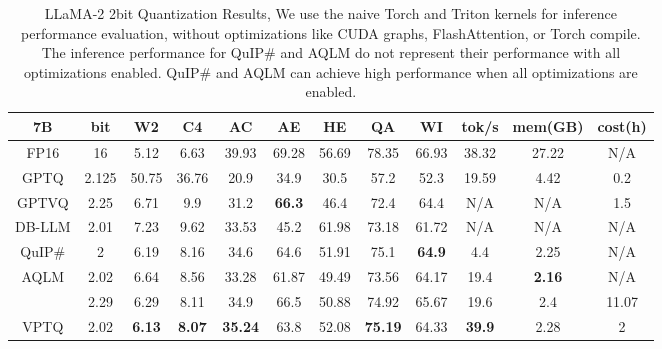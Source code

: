 
\begin{table}[tbh!]
\caption{LLaMA-2 2bit Quantization Results, \footnotesize{\footnotemark[1] We use the naive Torch and Triton kernels for inference performance evaluation, without optimizations like CUDA graphs, FlashAttention, or Torch compile. The inference performance for QuIP\# and AQLM do not represent their performance with all optimizations enabled. QuIP\# and AQLM can achieve high performance when all optimizations are enabled.}}
\label{tab:llama2-2bit-all}
\centering
\resizebox{0.85\textwidth}{!}
{
\begin{tabular}{c|cccccccc|ccc}
\hline
7B     & bit   & W2            & C4            & AC             & AE             & HE             & QA             & WI             & tok/s         & mem(GB)        & cost(h) \\ \hline
FP16   & 16    & 5.12          & 6.63          & 39.93          & 69.28          & 56.69          & 78.35          & 66.93          & 38.32         & 27.22          & N/A     \\
GPTQ   & 2.125 & 50.75         & 36.76         & 20.9           & 34.9           & 30.5           & 57.2           & 52.3           & 19.59         & 4.42           & 0.2     \\
GPTVQ  & 2.25  & 6.71          & 9.9           & 31.2           & \textbf{66.3}  & 46.4           & 72.4           & 64.4           & N/A           & N/A            & 1.5     \\
DB-LLM & 2.01  & 7.23          & 9.62          & 33.53          & 45.2           & 61.98          & 73.18          & 61.72          & N/A           & N/A            & N/A     \\
QuIP\#\footnotemark[1] & 2     & 6.19          & 8.16          & 34.6           & 64.6           & 51.91          & 75.1           & \textbf{64.9}  & 4.4           & 2.25           & N/A      \\
AQLM\footnotemark[1]   & 2.02  & 6.64          & 8.56          & 33.28          & 61.87          & 49.49          & 73.56          & 64.17          & 19.4          & \textbf{2.16}  & N/A      \\
       & 2.29  & 6.29          & 8.11          & 34.9           & 66.5           & 50.88          & 74.92          & 65.67          & 19.6          & 2.4            & 11.07   \\
VPTQ   & 2.02  & \textbf{6.13} & \textbf{8.07} & \textbf{35.24} & 63.8           & 52.08          & \textbf{75.19} & 64.33          & \textbf{39.9} & 2.28           & 2       \\

\end{tabular}}
\end{table}
